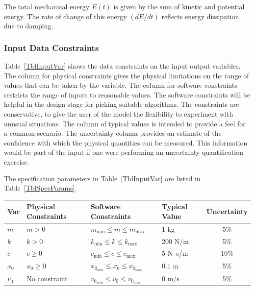 \documentclass[12pt]{article}
\begin{document}
The total mechanical energy $E(t)$ is given by the sum of kinetic and 
potential energy. The rate of change of this energy $(dE/dt)$ reflects energy 
dissipation due to damping.

\subsubsection{Input Data Constraints} \label{sec_DataConstraints}    

Table~\ref{TblInputVar} shows the data constraints on the input output
variables.  The column for physical constraints gives the physical limitations
on the range of values that can be taken by the variable.  The column for
software constraints restricts the range of inputs to reasonable values.  The
software constraints will be helpful in the design stage for picking suitable
algorithms.  The constraints are conservative, to give the user of the model the
flexibility to experiment with unusual situations.  The column of typical values
is intended to provide a feel for a common scenario.  The uncertainty column
provides an estimate of the confidence with which the physical quantities can be
measured.  This information would be part of the input if one were performing an
uncertainty quantification exercise.

The specification parameters in Table~\ref{TblInputVar} are listed in
Table~\ref{TblSpecParams}.

\begin{table}[!h]
  \caption{Input Variables} \label{TblInputVar}
  \renewcommand{\arraystretch}{1.2}
\noindent \begin{longtable*}{l l l l c} 
  \toprule
  \textbf{Var} & \textbf{Physical Constraints} & \textbf{Software Constraints} &
                             \textbf{Typical Value} & \textbf{Uncertainty}\\
  \midrule 
  $m$ & $m > 0$ & $m_{\text{min}} \leq m \leq m_{\text{max}}$ & 1
  \si[per-mode=symbol] {\kilogram} & 5\%\\

  $k$ & $k > 0$ & $k_{\text{min}} \leq k \leq k_{\text{max}}$ & 200 
  \si[per-mode=symbol] {\newton\per\meter} & 5\%\\

  $c$ & $c \geq 0$ & $c_{\text{min}} \leq c \leq c_{\text{max}}$ & 5 
  \si[per-mode=symbol] {\newton\second\per\meter} & 10\%\\

  $x_{0}$ & $x_{0} \geq 0$ & $x_{0_{min}} \leq x_{0} \leq 
  x_{0_{max}}$ & 0.1 \si[per-mode=symbol] {\meter} & 5\%\\

  $v_{0}$ & No constraint & $v_{0_{min}} \leq v_{0} \leq 
  v_{0_{max}}$ & 0 \si[per-mode=symbol] {\meter\per\second} & 5\%\\
  \bottomrule
\end{longtable*}
\end{table}
\end{document}
